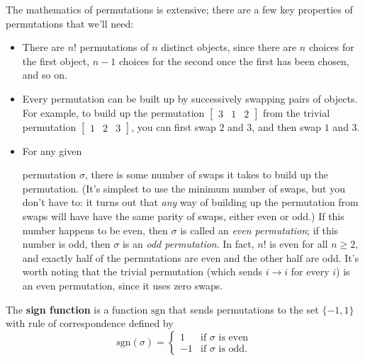 The mathematics of permutations is extensive; there are a few key properties of permutations that we'll need:

\begin{itemize}
\item There are $n!$ permutations of $n$ distinct objects, since there are $n$ choices for the first object, $n-1$ choices for the second once the first has been chosen, and so on.

\item Every permutation can be built up by successively swapping pairs of objects.  For example, to build up the permutation $\begin{bmatrix} 3 & 1 & 2 \end{bmatrix}$ from the trivial permutation $\begin{bmatrix} 1 & 2 & 3 \end{bmatrix}$, you can first swap $2$ and $3$, and then swap $1$ and $3$.

\item \hypertarget{permutation_parity}{For any given} permutation $\sigma$, there is some number of swaps it takes to build up the permutation.  (It's simplest to use the minimum number of swaps, but you don't have to: it turns out that \emph{any} way of building up the permutation from swaps will have have the same parity of swaps, either even or odd.) 
If this number happens to be even, then $\sigma$ is called an \emph{even permutation}; if this number is odd, then $\sigma$ is an \emph{odd permutation}.  In fact, $n!$ is even for all $n\geq 2$, and exactly half of the permutations are even and the other half are odd.  It's worth noting that the trivial permutation (which sends $i\rightarrow i$ for every $i$) is an even permutation, since it uses zero swaps.
\end{itemize}

\begin{definition}
The {\bf sign function} is a function $\text{sgn}$ that sends permutations to the set $\{-1,1\}$ with rule of correspondence defined by
\[ \text{sgn}(\sigma) = 
\left\{ \begin{array}{rl}
1 & \mbox{if $\sigma$ is even}\\
-1 & \mbox{if $\sigma$ is odd}.\end{array} \right.
\]
\end{definition}


